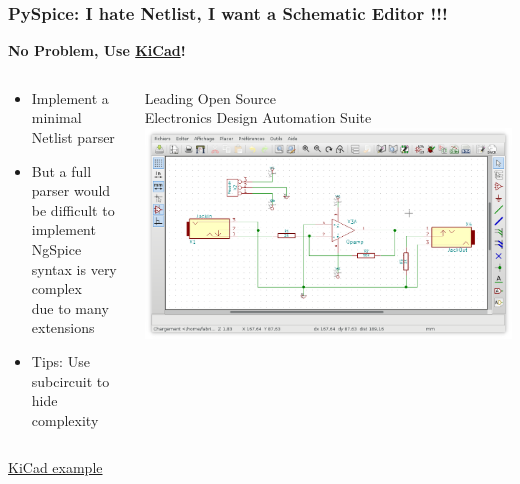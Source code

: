 \begin{frame}
  \frametitle{PySpice: I hate Netlist, I want a Schematic Editor !!! }
  \centerline{\textbf{No Problem, Use \href{http://kicad-pcb.org}{KiCad}!}}
  \vspace{1em}
  \begin{columns}
    \begin{column}{.6\textwidth}
      \begin{itemize}
      \item Implement a minimal Netlist parser
      \item \alert{But a full parser would be difficult to implement} \\
        NgSpice syntax is very complex \\
        due to many extensions \\
      \item Tips: Use subcircuit to hide complexity
      \end{itemize}
    \end{column}
    \begin{column}{.4\textwidth}
      \begin{center}
        Leading Open Source \\
        Electronics Design Automation Suite \\[1em]
        \includegraphics[width=1.\textwidth]{images/kicad.png}
      \end{center}
    \end{column}
  \end{columns}
  \vspace{1em}
  \centerline{\small \href{https://pyspice.fabrice-salvaire.fr/examples/spice-parser/kicad-example.html}{KiCad example}}
\end{frame}

